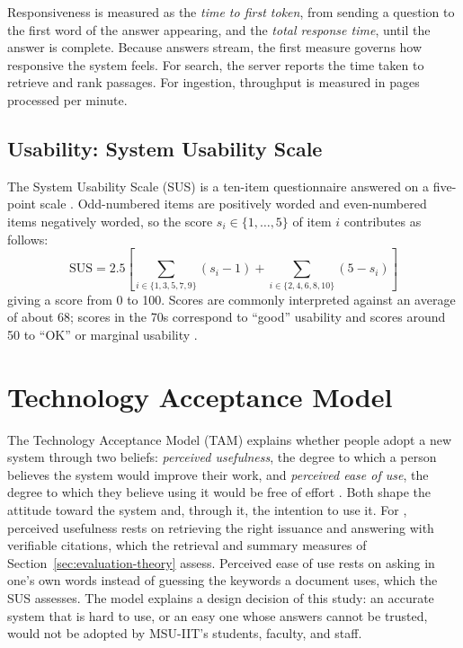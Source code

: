 Responsiveness is measured as the \emph{time to first token}, from sending a question to the first word of the answer appearing, and the \emph{total response time}, until the answer is complete. Because answers stream, the first measure governs how responsive the system feels. For search, the server reports the time taken to retrieve and rank passages. For ingestion, throughput is measured in pages processed per minute.

\subsection{Usability: System Usability Scale}\label{sec:sus}

The System Usability Scale (SUS) is a ten-item questionnaire answered on a five-point scale \citep{brooke1996sus}. Odd-numbered items are positively worded and even-numbered items negatively worded, so the score $s_i \in \{1,\dots,5\}$ of item $i$ contributes as follows:
\begin{equation}
  \text{SUS} = 2.5 \left[ \sum_{i \in \{1,3,5,7,9\}} (s_i - 1) + \sum_{i \in \{2,4,6,8,10\}} (5 - s_i) \right] \label{eq:sus}
\end{equation}
giving a score from 0 to 100. Scores are commonly interpreted against an average of about 68; scores in the 70s correspond to ``good'' usability and scores around 50 to ``OK'' or marginal usability \citep{bangor2009}.

\section{Technology Acceptance Model}\label{sec:tam}

The Technology Acceptance Model (TAM) explains whether people adopt a new system through two beliefs: \emph{perceived usefulness}, the degree to which a person believes the system would improve their work, and \emph{perceived ease of use}, the degree to which they believe using it would be free of effort \citep{davis1989tam}. Both shape the attitude toward the system and, through it, the intention to use it. For \cs{}, perceived usefulness rests on retrieving the right issuance and answering with verifiable citations, which the retrieval and summary measures of Section~\ref{sec:evaluation-theory} assess. Perceived ease of use rests on asking in one's own words instead of guessing the keywords a document uses, which the SUS assesses. The model explains a design decision of this study: an accurate system that is hard to use, or an easy one whose answers cannot be trusted, would not be adopted by MSU-IIT's students, faculty, and staff.

